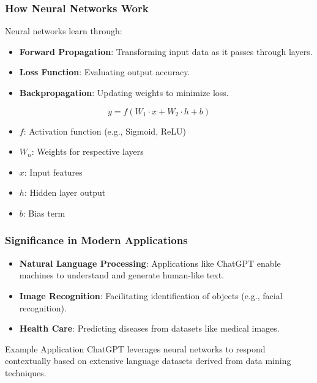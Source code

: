 \documentclass[aspectratio=169]{beamer}
\begin{document}
\begin{frame}[fragile]
    \frametitle{How Neural Networks Work}
    Neural networks learn through:
    \begin{itemize}
        \item \textbf{Forward Propagation}: Transforming input data as it passes through layers.
        \item \textbf{Loss Function}: Evaluating output accuracy.
        \item \textbf{Backpropagation}: Updating weights to minimize loss.
    \end{itemize}
    \begin{equation}
        y = f \left( W_1 \cdot x + W_2 \cdot h + b \right)
    \end{equation}
    \begin{itemize}
        \item \( f \): Activation function (e.g., Sigmoid, ReLU)
        \item \( W_n \): Weights for respective layers
        \item \( x \): Input features
        \item \( h \): Hidden layer output
        \item \( b \): Bias term
    \end{itemize}
\end{frame}

\begin{frame}[fragile]
    \frametitle{Significance in Modern Applications}
    \begin{itemize}
        \item \textbf{Natural Language Processing}: Applications like ChatGPT enable machines to understand and generate human-like text.
        \item \textbf{Image Recognition}: Facilitating identification of objects (e.g., facial recognition).
        \item \textbf{Health Care}: Predicting diseases from datasets like medical images.
    \end{itemize}
    \begin{block}{Example Application}
        ChatGPT leverages neural networks to respond contextually based on extensive language datasets derived from data mining techniques.
    \end{block}
\end{frame}
\end{document}
